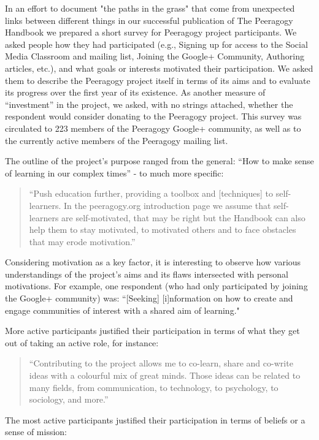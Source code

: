 \documentclass{acm_proc_article-sp}
\begin{document}
In an effort to document "the paths in the grass" \cite{Wall} that come from unexpected links between different things in our successful publication of The Peeragogy Handbook we prepared a short survey for Peeragogy project participants. We asked people how they had participated (e.g., Signing up for access to the Social Media Classroom and mailing list, Joining the Google+ Community, Authoring articles, etc.), and what goals or interests motivated their participation. We asked them to describe the Peeragogy project itself in terms of its aims and to evaluate its progress over the first year of its existence. As another measure of ``investment'' in the project, we asked, with no strings attached, whether the respondent would consider donating to the Peeragogy project. This survey was circulated to 223 members of the Peeragogy Google+ community, as well as to the currently active members of the Peeragogy mailing list.

The outline of the project's purpose ranged from the general: ``How to
make sense of learning in our complex times'' - to much more
specific:

\begin{quote}
``Push education further, providing a toolbox and [techniques] to
self-learners. In the peeragogy.org introduction page we assume that
self-learners are self-motivated, that may be right but the Handbook
can also help them to stay motivated, to motivated others and to face obstacles that may erode motivation.''
\end{quote}

Considering motivation as a key factor, it is interesting to observe
how various understandings of the project's aims and its flaws
intersected with personal motivations. For example, one respondent
(who had only participated by joining the Google+ community) was:
``[Seeking] [i]nformation on how to create and engage communities of
interest with a shared aim of learning."

More active participants justified their participation in terms of what they get out of taking an active role, for instance:

\begin{quote}
``Contributing to the project allows me to co-learn, share and co-write ideas with a colourful mix of great minds. Those ideas can be related to many fields, from communication, to technology, to psychology, to sociology, and more.''
\end{quote}

The most active participants justified their participation in terms of
beliefs or a sense of mission:
\end{document}
